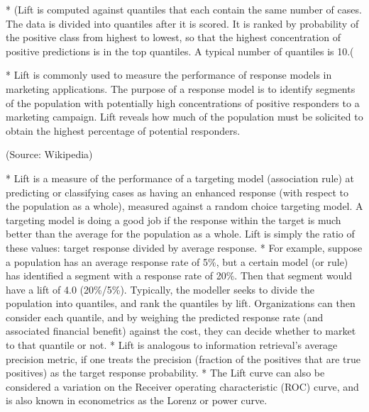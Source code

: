 * (Lift is computed against quantiles that each contain the same number of cases. The data is divided into quantiles after it is scored. It is ranked by probability of the positive class from highest to lowest, so that the highest concentration of positive predictions is in the top quantiles. A typical number of quantiles is 10.(

* Lift is commonly used to measure the performance of response models in marketing applications. The purpose of a response model is to identify segments of the population with potentially high concentrations of positive responders to a marketing campaign. Lift reveals how much of the population must be solicited to obtain the highest percentage of potential responders.


(Source: Wikipedia)


* Lift is a measure of the performance of a targeting model (association rule) at predicting or classifying cases as having an enhanced response (with respect to the population as a whole), measured against a random choice targeting model. A targeting model is doing a good job if the response within the target is much better than the average for the population as a whole. Lift is simply the ratio of these values: target response divided by average response.
* For example, suppose a population has an average response rate of 5\%, but a certain model (or rule) has identified a segment with a response rate of 20\%. Then that segment would have a lift of 4.0 (20\%/5\%).
Typically, the modeller seeks to divide the population into quantiles, and rank the quantiles by lift. Organizations can then consider each quantile, and by weighing the predicted response rate (and associated financial benefit) against the cost, they can decide whether to market to that quantile or not.
* Lift is analogous to information retrieval's average precision metric, if one treats the precision (fraction of the positives that are true positives) as the target response probability.
* The Lift curve can also be considered a variation on the Receiver operating characteristic (ROC) curve, and is also known in econometrics as the Lorenz or power curve.



